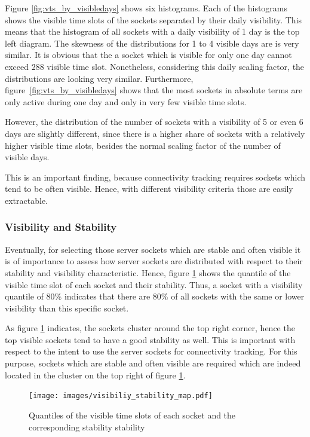Figure \ref{fig:vts_by_visibledays} shows six histograms. Each of the histograms shows the visible time slots of the sockets separated by their daily visibility. This means that the histogram of all sockets with a daily visibility of 1 day is the top left diagram. The skewness of the distributions for 1 to 4 visible days are is very similar. 
It is obvious that the a socket which is visible for only one day cannot exceed 288 visible time slot. 
Nonetheless, considering this daily scaling factor, the distributions are looking very similar. 
Furthermore, figure \ref{fig:vts_by_visibledays} shows that the most sockets in absolute terms are only active during one day and only in very few visible time slots.

However, the distribution of the number of sockets with a visibility of 5 or even 6 days are slightly different, since there is a higher share of sockets with a relatively higher visible time slots, besides the normal scaling factor of the number of visible days.

This is an important finding, because connectivity tracking requires sockets which tend to be often visible. Hence, with different visibility criteria those are easily extractable. 

\subsubsection{Visibility and Stability} Eventually, for selecting those \glspl{server socket} which are stable and often visible it is of importance to assess how \glspl{server socket} are distributed with respect to their stability and visibility characteristic. 
Hence, figure \ref{fig:rankedVisibility} shows the quantile of the visible time slot of each socket and their stability. 
Thus, a socket with a visibility quantile of 80\% indicates that there are 80\% of all sockets with the same or lower visibility than this specific socket.

As figure \ref{fig:rankedVisibility} indicates, the sockets cluster around the top right corner, hence the top visible sockets tend to have a good stability as well. This is important with respect to the intent to use the server sockets for connectivity tracking. For this purpose, sockets which are stable and often visible are required which are indeed located in the cluster on the top right of figure \ref{fig:rankedVisibility}.
 
\begin{figure}[ht] \centering 
	\texttt{[image: images/visibiliy\_stability\_map.pdf]} \caption{Quantiles of the visible time slots of each socket and the corresponding stability stability} 
	\label{fig:rankedVisibility} 
\end{figure}

